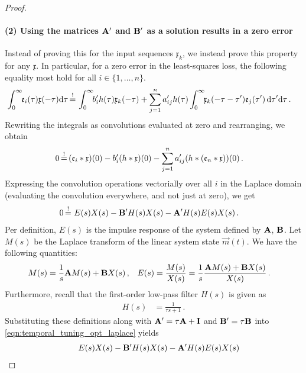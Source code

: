 \begin{proof}
\paragraph{(2) Using the matrices $\mathbf{A}'$ and $\mathbf{B}'$ as a solution results in a zero error}
Instead of proving this for the input sequences $\mathfrak{x}_k$, we instead prove this property for any $\mathfrak{x}$.
In particular, for a zero error in the least-squares loss, the following equality most hold for all $i \in \{1, \ldots, n\}$.
\begin{align*}	
	\int_{0}^\infty \!\! \mathfrak{e}_i(\tau) \mathfrak{x}(-\tau) \mathrm{d}\tau
	&\operatorname{\overset{!}{=}} \,
	\int_0^\infty \!\! b'_{i} h(\tau) \mathfrak{x}_k(-\tau) + \sum_{j=1}^n a'_{ij} h(\tau) \int_0^\infty \!\! \mathfrak{x}_k(-\tau - \tau') \mathfrak{e}_j(\tau') \, \mathrm{d}\tau' \mathrm{d}\tau  \,.
\end{align*}
Rewriting the integrals as convolutions evaluated at zero and rearranging, we obtain
\begin{align*}	
	0
	&\operatorname{\overset{!}{=}} \, (\mathfrak{e}_i \ast \mathfrak{x})(0) - b'_{i} (h \ast \mathfrak{x})(0) - \sum_{j=1}^n a'_{ij} (h \ast (\mathfrak{e}_n \ast \mathfrak{x}))(0) \,.
\end{align*}
Expressing the convolution operations vectorially over all $i$ in the Laplace domain (evaluating the convolution everywhere, and not just at zero), we get
\begin{align}
	0 &\operatorname{\overset{!}{=}} \,  E(s) X(s) - \mathbf{B}' H(s) X(s) - \mathbf{A}' H(s) E(s) X(s) \,.
	\label{eqn:temporal_tuning_opt_laplace}
\end{align}
Per definition, $E(s)$ is the impulse response of the \LTI system defined by $\mathbf{A}$, $\mathbf{B}$.
Let $M(s)$ be the Laplace transform of the linear system state $\vec m(t)$.
We have the following quantities:
\begin{align*}
	M(s) &= \frac{1}{s} \mathbf{A} M(s) + \mathbf{B} X(s) \,,
	& E(s) &= \frac{M(s)}{X(s)} = \frac{1}s \frac{\mathbf{A} M(s) + \mathbf{B} X(s)}{X(s)} \,.
\end{align*}
Furthermore, recall that the first-order low-pass filter $H(s)$ is given as
\begin{align*}
	H(s) &= \frac{1}{\tau s + 1} \,.
\end{align*}
Substituting these definitions along with $\mathbf{A}' = \tau \mathbf{A} + \mathbf{I}$ and $\mathbf{B}' = \tau \mathbf{B}$ into \cref{eqn:temporal_tuning_opt_laplace} yields
\begin{align*}
	&\hphantom{{}={}} E(s) X(s) - \mat B' H(s) X(s) - \mat A' H(s) E(s) X(s) \\

\end{align*}
\end{proof}
